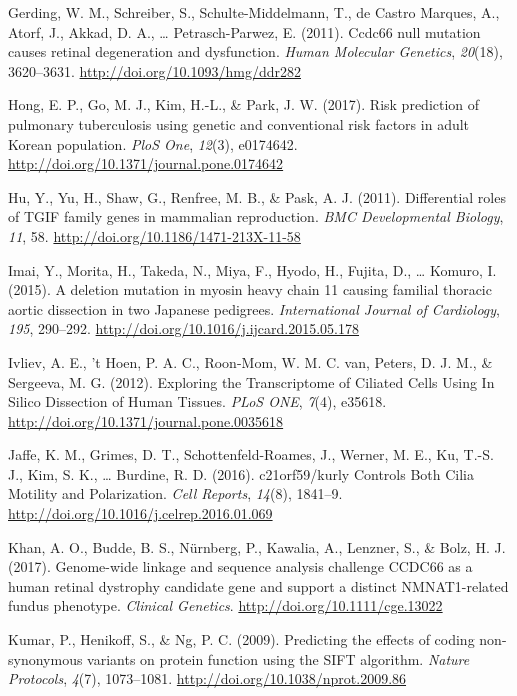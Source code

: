 \documentclass[12pt,twoside]{reedthesis}
\theoremstyle{definition}
\theoremstyle{definition}
\theoremstyle{remark}
\begin{document}
  \hypertarget{ref-Gerding2011}{}
  Gerding, W. M., Schreiber, S., Schulte-Middelmann, T., de Castro
  Marques, A., Atorf, J., Akkad, D. A., \ldots{} Petrasch-Parwez, E.
  (2011). Ccdc66 null mutation causes retinal degeneration and
  dysfunction. \emph{Human Molecular Genetics}, \emph{20}(18), 3620--3631.
  \url{http://doi.org/10.1093/hmg/ddr282}
  
  \hypertarget{ref-Hong2017}{}
  Hong, E. P., Go, M. J., Kim, H.-L., \& Park, J. W. (2017). Risk
  prediction of pulmonary tuberculosis using genetic and conventional risk
  factors in adult Korean population. \emph{PloS One}, \emph{12}(3),
  e0174642. \url{http://doi.org/10.1371/journal.pone.0174642}
  
  \hypertarget{ref-Hu2011}{}
  Hu, Y., Yu, H., Shaw, G., Renfree, M. B., \& Pask, A. J. (2011).
  Differential roles of TGIF family genes in mammalian reproduction.
  \emph{BMC Developmental Biology}, \emph{11}, 58.
  \url{http://doi.org/10.1186/1471-213X-11-58}
  
  \hypertarget{ref-Imai2015}{}
  Imai, Y., Morita, H., Takeda, N., Miya, F., Hyodo, H., Fujita, D.,
  \ldots{} Komuro, I. (2015). A deletion mutation in myosin heavy chain 11
  causing familial thoracic aortic dissection in two Japanese pedigrees.
  \emph{International Journal of Cardiology}, \emph{195}, 290--292.
  \url{http://doi.org/10.1016/j.ijcard.2015.05.178}
  
  \hypertarget{ref-Ivliev2012}{}
  Ivliev, A. E., 't Hoen, P. A. C., Roon-Mom, W. M. C. van, Peters, D. J.
  M., \& Sergeeva, M. G. (2012). Exploring the Transcriptome of Ciliated
  Cells Using In Silico Dissection of Human Tissues. \emph{PLoS ONE},
  \emph{7}(4), e35618. \url{http://doi.org/10.1371/journal.pone.0035618}
  
  \hypertarget{ref-Jaffe2016}{}
  Jaffe, K. M., Grimes, D. T., Schottenfeld-Roames, J., Werner, M. E., Ku,
  T.-S. J., Kim, S. K., \ldots{} Burdine, R. D. (2016). c21orf59/kurly
  Controls Both Cilia Motility and Polarization. \emph{Cell Reports},
  \emph{14}(8), 1841--9. \url{http://doi.org/10.1016/j.celrep.2016.01.069}
  
  \hypertarget{ref-Khan2017}{}
  Khan, A. O., Budde, B. S., Nürnberg, P., Kawalia, A., Lenzner, S., \&
  Bolz, H. J. (2017). Genome-wide linkage and sequence analysis challenge
  CCDC66 as a human retinal dystrophy candidate gene and support a
  distinct NMNAT1-related fundus phenotype. \emph{Clinical Genetics}.
  \url{http://doi.org/10.1111/cge.13022}
  
  \hypertarget{ref-Kumar2009}{}
  Kumar, P., Henikoff, S., \& Ng, P. C. (2009). Predicting the effects of
  coding non-synonymous variants on protein function using the SIFT
  algorithm. \emph{Nature Protocols}, \emph{4}(7), 1073--1081.
  \url{http://doi.org/10.1038/nprot.2009.86}
  
\end{document}
